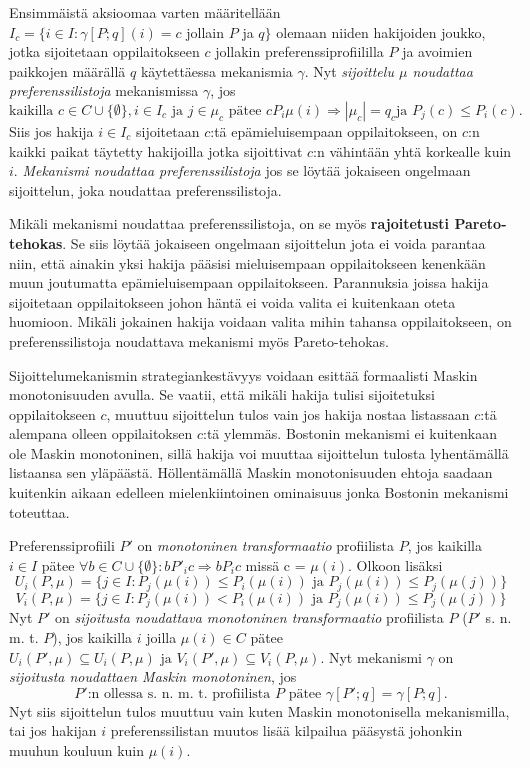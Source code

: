 \documentclass{tktltiki}
\begin{document}
Ensimmäistä aksioomaa varten määritellään \\ \(I_c = \{i \in I :
\gamma [P;q](i) = c\) jollain \(P\) ja \(q\}\) olemaan niiden
hakijoiden joukko, jotka sijoitetaan oppilaitokseen \(c\) jollakin
preferenssiprofiililla \(P\) ja avoimien paikkojen määrällä \(q\)
käytettäessa mekanismia \(\gamma\). Nyt \emph{sijoittelu \(\mu\)
  noudattaa preferenssilistoja} mekanismissa \(\gamma\),
jos \[\text{kaikilla }c \in C \cup \{\emptyset\}, i \in I_c\text{ ja }
j \in \mu_c\text{ pätee }cP_{i}\mu(i) \Rightarrow |\mu_c| = q_c\text{
  ja }P_j(c) \leq P_i(c).\] Siis jos hakija \(i \in I_c\) sijoitetaan
\(c\):tä epämieluisempaan oppilaitokseen, on \(c\):n kaikki paikat
täytetty hakijoilla jotka sijoittivat \(c\):n vähintään yhtä korkealle
kuin \(i\). \emph{Mekanismi noudattaa preferenssilistoja} jos se
löytää jokaiseen ongelmaan sijoittelun, joka noudattaa
preferenssilistoja.

Mikäli mekanismi noudattaa preferenssilistoja, on se myös
\textbf{rajoitetusti Pareto-tehokas}. Se siis löytää jokaiseen
ongelmaan sijoittelun jota ei voida parantaa niin, että ainakin yksi
hakija pääsisi mieluisempaan oppilaitokseen kenenkään muun joutumatta
epämieluisempaan oppilaitokseen. Parannuksia joissa hakija sijoitetaan
oppilaitokseen johon häntä ei voida valita ei kuitenkaan oteta
huomioon. Mikäli jokainen hakija voidaan valita mihin tahansa
oppilaitokseen, on preferenssilistoja noudattava mekanismi myös
Pareto-tehokas.

Sijoittelumekanismin strategiankestävyys voidaan esittää formaalisti
Maskin monotonisuuden avulla. Se vaatii, että mikäli hakija tulisi
sijoitetuksi oppilaitokseen \(c\), muuttuu sijoittelun tulos vain jos
hakija nostaa listassaan \(c\):tä alempana olleen oppilaitoksen
\(c\):tä ylemmäs. Bostonin mekanismi ei kuitenkaan ole Maskin
monotoninen, sillä hakija voi muuttaa sijoittelun tulosta lyhentämällä
listaansa sen yläpäästä. Höllentämällä Maskin monotonisuuden ehtoja
saadaan kuitenkin aikaan edelleen mielenkiintoinen ominaisuus jonka
Bostonin mekanismi toteuttaa.

Preferenssiprofiili \(P'\) on \emph{monotoninen transformaatio}
profiilista \(P\), jos kaikilla \(i \in I\) pätee \(\forall b \in C
\cup \{\emptyset\}:bP'_{i}c \Rightarrow bP_{i}c\) missä c =
\(\mu(i)\). Olkoon lisäksi \[U_i(P,\mu) = \{j \in I : P_j(\mu (i)) \leq
P_i(\mu (i)) \text{ ja } P_j(\mu (i)) \leq P_j(\mu (j))\}\]
\[V_i(P,\mu) = \{j \in I : P_j(\mu (i)) < P_i(\mu (i)) \text{ ja } P_j(\mu
(i)) \leq P_j(\mu (j))\}\] Nyt \(P'\) on \emph{sijoitusta noudattava
  monotoninen transformaatio} profiilista \(P\) (\(P'\) s. n. m. t.
\(P\)), jos kaikilla \(i\) joilla \(\mu (i) \in C\) pätee
\(U_i(P',\mu) \subseteq U_i(P,\mu) \text{ ja } V_i(P',\mu) \subseteq
V_i(P,\mu)\). Nyt mekanismi \(\gamma\) on \emph{sijoitusta noudattaen
  Maskin monotoninen}, jos \[P'\text{:n ollessa s. n. m. t.
  profiilista }P \text{ pätee }\gamma [P';q] = \gamma [P;q].\] Nyt
siis sijoittelun tulos muuttuu vain kuten Maskin monotonisella
mekanismilla, tai jos hakijan \(i\) preferenssilistan muutos lisää
kilpailua pääsystä johonkin muuhun kouluun kuin \(\mu (i)\).
\end{document}
